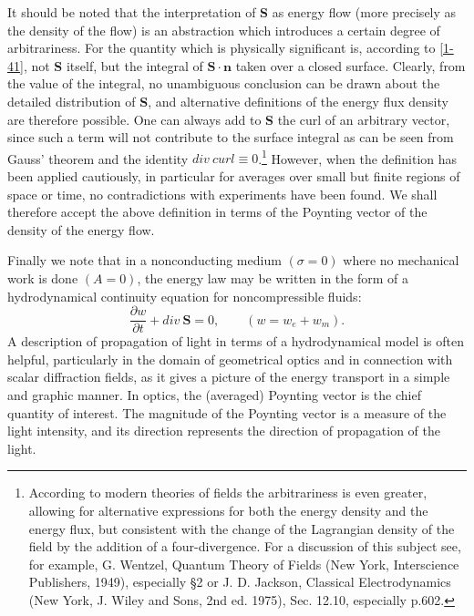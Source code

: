\documentclass[lang=en,11pt]{elegantbook}
\begin{document}
	It should be noted that the interpretation of \textbf{S} as energy flow (more precisely as the density of the flow) is an abstraction which introduces a certain degree of arbitrariness.	For the quantity which is physically significant is, according to \eqref{1-41}, not \textbf{S} itself, but the integral of $\mathbf{S\cdot n}$ taken over a closed surface. Clearly, from the value of the integral, no unambiguous conclusion can be drawn about the detailed distribution of \textbf{S}, and alternative definitions of the energy flux density are therefore possible. One can always add to \textbf{S} the curl of an arbitrary vector, since such a term will not contribute to the surface integral as can be seen from Gauss' theorem and the identity $div\ curl\equiv0$.\footnote{According to modern theories of fields the arbitrariness is even greater, allowing for alternative expressions
	for both the energy density and the energy flux, but consistent with the change of the Lagrangian density	of the field by the addition of a four-divergence. For a discussion of this subject see, for example, G.	Wentzel, Quantum Theory of Fields (New York, Interscience Publishers, 1949), especially \S2 or J. D.	Jackson, Classical Electrodynamics (New York, J. Wiley and Sons, 2nd ed. 1975), Sec. 12.10, especially p.602.}	However, when the definition has been applied cautiously, in particular for averages over small but finite regions of space or time, no contradictions with experiments have been found. We shall therefore accept the above definition in terms of the Poynting	vector of the density of the energy flow.\par 
	Finally we note that in a nonconducting medium $(\sigma=0)$ where no mechanical work is done $(A =	0)$, the energy law may be written in the form of a hydrodynamical continuity equation for noncompressible fluids:
	\begin{equation}
		\frac{\partial w}{\partial t}+div\ \mathbf{S}=0,\qquad (w=w_e+w_m).
		\label{1-43}
	\end{equation}
	A description of propagation of light in terms of a hydrodynamical model is often helpful, particularly in the domain of geometrical optics and in connection with scalar diffraction fields, as it gives a picture of the energy transport in a simple and graphic manner. In optics, the (averaged) Poynting vector is the chief quantity of interest. The magnitude of the Poynting vector is a measure of the light intensity, and its direction represents the direction of propagation of the light.
	
\end{document}

